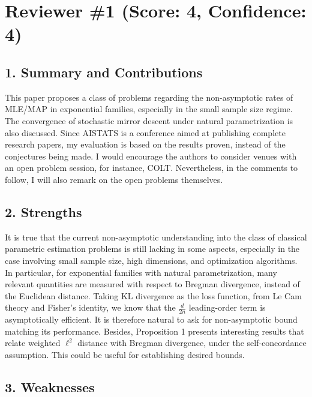 
\section*{Reviewer \#1 (Score: 4, Confidence: 4)}

\subsection*{1. Summary and Contributions}

This paper proposes a class of problems regarding the non-asymptotic rates of MLE/MAP in exponential families, especially in the small sample size regime. The convergence of stochastic mirror descent under natural parametrization is also discussed. Since AISTATS is a conference aimed at publishing complete research papers, my evaluation is based on the results proven, instead of the conjectures being made. I would encourage the authors to consider venues with an open problem session, for instance, COLT. Nevertheless, in the comments to follow, I will also remark on the open problems themselves.

\subsection*{2. Strengths}

It is true that the current non-asymptotic understanding into the class of classical parametric estimation problems is still lacking in some aspects, especially in the case involving small sample size, high dimensions, and optimization algorithms. In particular, for exponential families with natural parametrization, many relevant quantities are measured with respect to Bregman divergence, instead of the Euclidean distance. Taking KL divergence as the loss function, from Le Cam theory and Fisher's identity, we know that the $\frac{d}{2n}$ leading-order term is asymptotically efficient. It is therefore natural to ask for non-asymptotic bound matching its performance. Besides, Proposition 1 presents interesting results that relate weighted $\ell^2$ distance with Bregman divergence, under the self-concordance assumption. This could be useful for establishing desired bounds.

\subsection*{3. Weaknesses}

